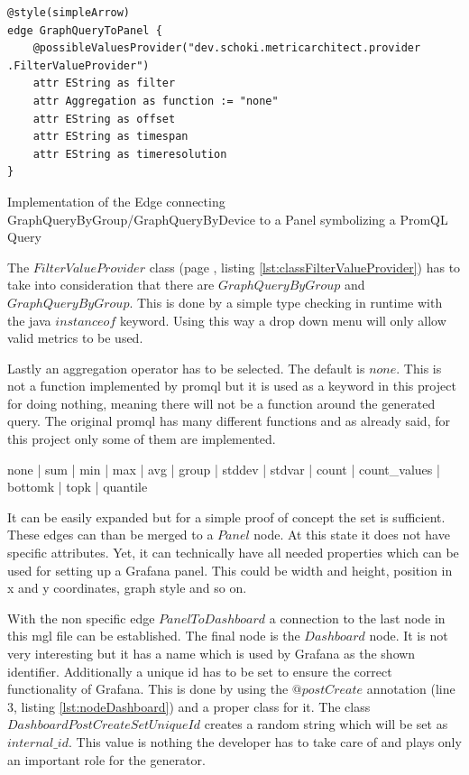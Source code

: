 \begin{listing}[H]
	\begin{verbatim}
@style(simpleArrow)
edge GraphQueryToPanel {
	@possibleValuesProvider("dev.schoki.metricarchitect.provider .FilterValueProvider")
	attr EString as filter
	attr Aggregation as function := "none"
	attr EString as offset
	attr EString as timespan
	attr EString as timeresolution
}
	\end{verbatim}
	\caption{Implementation of the Edge connecting GraphQueryByGroup/GraphQueryByDevice to a Panel symbolizing a PromQL Query}
	\label{lst:GraphQueryToPanel}
\end{listing}

The $FilterValueProvider$ class (page \pageref{lst:classFilterValueProvider}, listing \ref{lst:classFilterValueProvider}) has to take into consideration that there are $GraphQueryByGroup$ and $GraphQueryByGroup$. This is done by a simple type checking in runtime with the java $instanceof$ keyword. Using this way a drop down menu will only allow valid metrics to be used.

Lastly an aggregation operator has to be selected. The default is $none$. This is not a function implemented by \gls{promql} but it is used as a keyword in this project for doing nothing, meaning there will not be a function around the generated query. The original \gls{promql} has many different functions and as already said, for this project only some of them are implemented. 

\begin{center}
	none | sum | min | max | avg | group | stddev | stdvar | count | count\_values | bottomk | topk  | quantile
\end{center}

It can be easily expanded but for a simple proof of concept the set is sufficient. These edges can than be merged to a $Panel$ node. At this state it does not have specific attributes. Yet, it can technically have all needed properties which can be used for setting up a Grafana panel. This could be width and height, position in x and y coordinates, graph style and so on.

With the non specific edge $PanelToDashboard$ a connection to the last node in this \gls{mgl} file can be established. The final node is the $Dashboard$ node. It is not very interesting but it has a name which is used by Grafana as the shown identifier. Additionally a unique id has to be set to ensure the correct functionality of Grafana. This is done by using the $@postCreate$ annotation (line 3, listing \ref{lst:nodeDashboard}) and a proper class for it. The class $DashboardPostCreateSetUniqueId$ creates a random string which will be set as $internal\_id$. This value is nothing the developer has to take care of and plays only an important role for the generator.

